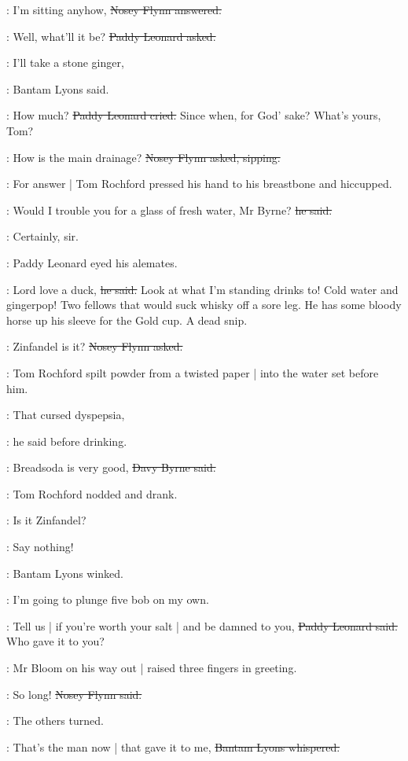 \nosey:
I'm sitting anyhow,
\sout{Nosey Flynn answered.}

\leonard:
Well, what'll it be?
\sout{Paddy Leonard asked.}

\bantam:
I'll take a stone ginger,

:
Bantam Lyons said.

\leonard:
How much?
\sout{Paddy Leonard cried.}
Since when, for God' sake?
What's yours, Tom?

\nosey:
How is the main drainage?
\sout{Nosey Flynn asked, sipping.}

:
For answer |
Tom Rochford pressed his hand to his breastbone and hiccupped.

\rochford:
Would I trouble you for a glass of fresh water, Mr Byrne?
\sout{he said.}

\davybyrne:
Certainly, sir.

:
Paddy Leonard eyed his alemates.

\leonard:
Lord love a duck,
\sout{he said.}
Look at what I'm standing drinks to!
Cold water and gingerpop!
Two fellows that would suck whisky off a sore leg.
He has some bloody horse up his sleeve for the Gold cup.
A dead snip.

\nosey:
Zinfandel is it?
\sout{Nosey Flynn asked.}

:
Tom Rochford spilt powder from a twisted paper |
into the water set before him.

\rochford:
That cursed dyspepsia,

:
he said before drinking.

\davybyrne:
Breadsoda is very good,
\sout{Davy Byrne said.}

:
Tom Rochford nodded and drank.

\nosey:
Is it Zinfandel?

\bantam:
Say nothing!

:
Bantam Lyons winked.

\bantam:
I'm going to plunge five bob on my own.

\leonard:
Tell us |
if you're worth your salt |
and be damned to you,
\sout{Paddy Leonard said.}
Who gave it to you?

:
Mr Bloom on his way out |
raised three fingers in greeting.

\nosey:
So long!
\sout{Nosey Flynn said.}

:
The others turned.

\bantam:
That's the man now |
that gave it to me,
\sout{Bantam Lyons whispered.}

